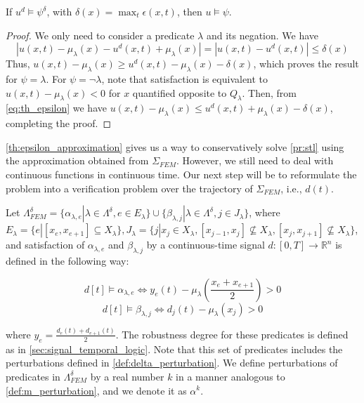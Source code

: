 \documentclass[oribibl]{llncs/llncs}
\newcommand*{\R}{\mathbb{R}}
\begin{document}
\begin{theorem}
\label{th:epsilon_approximation}
    If $u^d \models \psi^{\delta}$, with $\delta(x) = \max_t \epsilon(x, t)$, then $u \models \psi$.
\end{theorem}
\begin{proof}
    We only need to consider a predicate $\lambda$ and its negation. We have
    \begin{equation}
        \label{eq:th_epsilon}
         |u(x, t) - \mu_\lambda(x) - u^d(x, t) + \mu_\lambda(x)| = 
         |u(x, t) - u^d(x, t)| \leq \delta(x)
    \end{equation}
    Thus, $u(x, t) - \mu_\lambda(x) \geq u^d(x, t) -
    \mu_\lambda(x) - \delta(x)$, which proves the result for $\psi = \lambda$. For $\psi
    = \lnot \lambda$, note that satisfaction is equivalent to $u(x, t) -
    \mu_\lambda(x) < 0$ for $x$ quantified opposite to $Q_\lambda$. Then, from
    \cref{eq:th_epsilon} we have $u(x, t) - \mu_\lambda(x) \leq u^d(x, t) +
    \mu_\lambda(x) - \delta(x)$, completing the proof.
\end{proof}

\cref{th:epsilon_approximation} gives us a way to conservatively solve
\cref{pr:stl} using the approximation obtained from $\Sigma_{FEM}$.
However, we still need to deal with continuous functions in continuous time. Our
next step will be to reformulate the problem into a verification problem over
the trajectory of $\Sigma_{FEM}$, i.e., $d(t)$.

Let $\Lambda^{\delta}_{FEM} = \{\alpha_{\lambda, e} | \lambda \in
\Lambda^{\delta}, e \in E_{\lambda}\} \cup \{\beta_{\lambda, j} | \lambda \in
\Lambda^{\delta}, j \in J_{\lambda}\}$, where $E_{\lambda} = \{e | [x_e, x_{e+1}] \subseteq
X_{\lambda}\}, J_{\lambda} = \{j | x_j \in X_\lambda, [x_{j-1}, x_j] \not\subseteq
X_\lambda, [x_{j}, x_{j+1}] \not\subseteq X_\lambda \}$,
and satisfaction of $\alpha_{\lambda, e}$ and $\beta_{\lambda, j}$ by 
a continuous-time signal $d : [0, T] \to \R^n$
is defined in the following way:

\begin{equation}
    d[t] \models \alpha_{\lambda, e} \iff y_e(t) - 
    \mu_\lambda(\frac{x_e + x_{e + 1}}{2}) > 0 
\end{equation}
\begin{equation}
     d[t] \models \beta_{\lambda, j} \iff d_j(t) - \mu_\lambda(x_j) > 0
\end{equation}

where $y_e = \frac{d_e(t) + d_{e+1}(t)}{2}$. The robustness degree for these
predicates is defined as in \cref{sec:signal_temporal_logic}.
Note that this set of predicates includes the perturbations defined in
\cref{def:delta_perturbation}. We define perturbations of predicates in
$\Lambda^{\delta}_{FEM}$ by a real number $k$ in a manner analogous to
\cref{def:m_perturbation}, and we denote it as $\alpha^k$.
\end{document}
